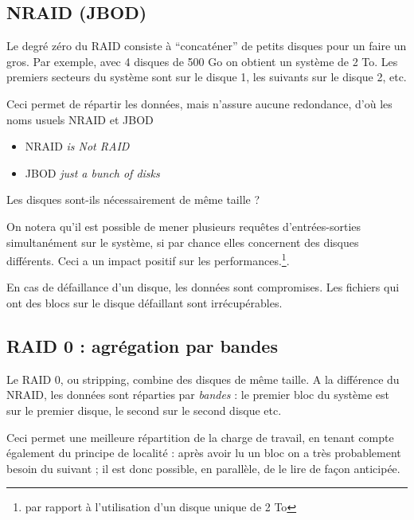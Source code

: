 \begin{multicols}{2}
\subsection{NRAID (JBOD)}

Le degré zéro du RAID consiste à ``concaténer'' de petits disques pour
un faire un gros. Par exemple, avec 4 disques de 500 Go on obtient un
système de 2 To. Les premiers secteurs du système sont sur le disque 1, les
suivants sur le disque 2, etc.

Ceci permet de répartir les données, mais n'assure aucune redondance,
d'où les noms usuels NRAID et JBOD
\begin{itemize}
\item NRAID \emph{is Not RAID}
\item JBOD  \emph{just a bunch of disks}
\end{itemize}

\begin{exercice}
Les disques sont-ils nécessairement de même taille ?
\end{exercice}

On notera qu'il est possible de mener plusieurs requêtes
d'entrées-sorties simultanément sur le système, si par chance elles
concernent des disques différents. Ceci a un impact positif sur les
performances.\footnote{par rapport à l'utilisation d'un disque unique
  de 2 To}.


En cas de défaillance d'un disque, les données sont compromises. Les
fichiers qui ont des blocs sur le disque défaillant sont
irrécupérables.




\subsection{RAID 0 : agrégation par bandes}

Le RAID 0, ou stripping, combine des disques de même taille.  A la
différence du NRAID, les données sont réparties par \emph{bandes} : le
premier bloc du système est sur le premier disque, le second sur le
second disque etc.
 

Ceci permet une meilleure répartition de la charge de travail, en
tenant compte également du principe de localité : après avoir lu un
bloc on a très probablement besoin du suivant ; il est donc possible,
en parallèle, de le lire de façon anticipée. 





\end{multicols}
